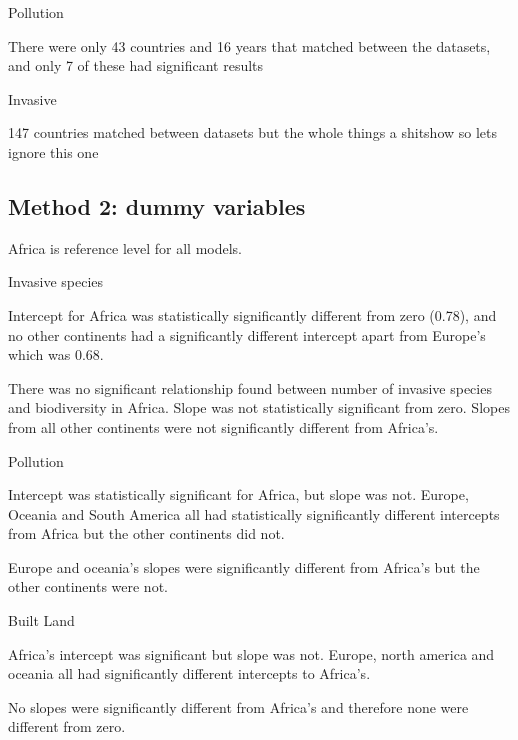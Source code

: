 \documentclass[11pt, a4paper, titlepage]{article}
\begin{document}
	Pollution \newline
	
	There were only 43 countries and 16 years that matched between the datasets, and only 7 of these had significant results \newline
	
	Invasive \newline
	
	147 countries matched between datasets but the whole things a shitshow so lets ignore this one
	
	
	
	
	 
	\subsection*{Method 2: dummy variables}
	 
	 Africa is reference level for all models. \newline

Invasive species \newline

Intercept for Africa was statistically significantly different from zero (0.78), and no other continents had a significantly different intercept apart from Europe's which was 0.68. 

There was no significant relationship found between number of invasive species and biodiversity in Africa. Slope was not statistically significant from zero. Slopes from all other continents were not significantly different from Africa's. \newline

Pollution \newline

Intercept was statistically significant for Africa, but slope was not. Europe, Oceania and South America all had statistically significantly different intercepts from Africa but the other continents did not.

Europe and oceania's slopes were significantly different from Africa's but the other continents were not. \newline

Built Land \newline

Africa's intercept was significant but slope was not. Europe, north america and oceania all had significantly different intercepts to Africa's.

No slopes were significantly different from Africa's and therefore none were different from zero. \newline
\end{document}
